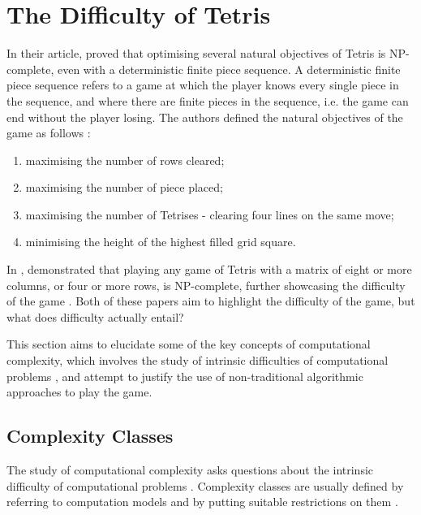 \documentclass[a4paper, 12pt]{extreport}
\begin{document}
		\section{The Difficulty of Tetris} \label{sec:diff-of-tetris}
		
			In their article, \citeauthor{tetris-is-hard-even-to-approx} \cite{tetris-is-hard-even-to-approx} proved that optimising several natural objectives of Tetris is NP-complete, even with a deterministic finite piece sequence. A deterministic finite piece sequence refers to a game at which the player knows every single piece in the sequence, and where there are finite pieces in the sequence, i.e. the game can end without the player losing. The authors defined the natural objectives of the game as follows \cite{tetris-is-hard-even-to-approx}:
			
			\begin{enumerate}
				\item maximising the number of rows cleared;
				\item maximising the number of piece placed;
				\item maximising the number of Tetrises - clearing four lines on the same move;
				\item minimising the height of the highest filled grid square.
			\end{enumerate}
			
			In \citeyear{tetris-o1-np-hard}, \citeauthor{tetris-o1-np-hard} \cite{tetris-o1-np-hard} demonstrated that playing any game of Tetris with a matrix of eight or more columns, or four or more rows, is NP-complete, further showcasing the difficulty of the game . Both of these papers aim to highlight the difficulty of the game, but what does difficulty actually entail?
			
			This section aims to elucidate some of the key concepts of computational complexity, which involves the study of intrinsic difficulties of computational problems \cite{cc:conceptual-perspective}, and attempt to justify the use of non-traditional algorithmic approaches to play the game.
			
			\subsection{Complexity Classes}\label{subsec:compclass}
				
				The study of computational complexity asks questions about the intrinsic difficulty of computational problems \cite{cc:conceptual-perspective}. Complexity classes are usually defined by referring to computation models and by putting suitable restrictions on them \cite{uniform-cc}. 
				
\end{document}
